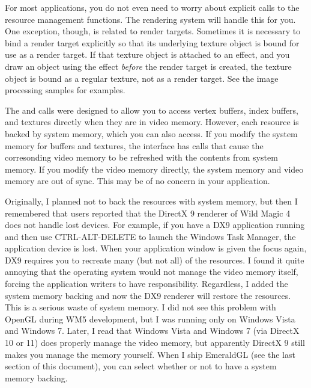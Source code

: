 \documentclass{article}
\begin{document}
For most applications, you do not even need to worry about explicit calls
to the resource management functions.  The rendering system will handle this
for you.  One exception, though, is related to render targets.  Sometimes it
is necessary to bind a render target explicitly so that its underlying
texture object is bound for use as a render target.  If that texture object
is attached to an effect, and you draw an object using the effect {\em before}
the render target is created, the texture object is bound as a regular texture,
not as a render target.  See the image processing samples for examples.

The  and  calls were designed to allow you to access
vertex buffers, index buffers, and textures directly when they are in video
memory.  However, each resource is backed by system memory, which you can
also access.  If you modify the system memory for buffers and textures, the
 interface has  calls that cause the corresonding
video memory to be refreshed with the contents from system memory.  If you
modify the video memory directly, the system memory and video memory are out
of sync.  This may be of no concern in your application.

Originally, I planned not to back the resources with system memory, but then
I remembered that users reported that the DirectX 9 renderer of Wild Magic 4
does not handle lost devices.  For example, if you have a DX9 application
running and then use CTRL-ALT-DELETE to launch the Windows Task Manager, the
application device is lost.  When your application window is given the focus
again, DX9 requires you to recreate many (but not all) of the resources.
I found it quite annoying that the operating system would not manage the
video memory itself, forcing the application writers to have responsibility.
Regardless, I added the system memory backing and now the DX9 renderer will
restore the resources.  This is a serious waste of system memory.  I did not
see this problem with OpenGL during WM5 development, but I was running only
on Windows Vista and Windows 7.  Later, I read that Windows Vista and Windows
7 (via DirectX 10 or 11) does properly manage the video memory, but apparently
DirectX 9 still makes you manage the memory yourself.  When I ship EmeraldGL
(see the last section of this document), you can select whether or not to
have a system memory backing.
\end{document}
